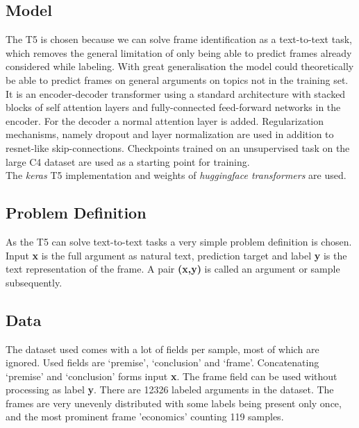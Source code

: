 \documentclass[11pt,a4paper,onecolumn,oneside,notitlepage]{article}
\begin{document}
\subsection{Model}
The T5 is chosen because we can solve frame identification as a text-to-text task, which removes the general limitation of only being able to predict frames already considered while labeling. With great generalisation the model could theoretically be able to predict frames on general arguments on topics not in the training set. It is an encoder-decoder transformer using a standard architecture with stacked blocks of  self attention layers and fully-connected feed-forward networks in the encoder. For the decoder a normal attention layer is added. Regularization mechanisms, namely dropout and layer normalization are used in addition to resnet-like skip-connections.\citep{T5} Checkpoints trained on an unsupervised task on the large C4 \citep{2019t5} dataset are used as a starting point for training.\\

The \textit{keras} \citep{keras} T5 implementation and weights of \textit{huggingface transformers} \citep{wolf-etal-2020-transformers} are used.


\subsection{Problem Definition}

As the T5 can solve text-to-text tasks a very simple problem definition is chosen. Input \textbf{x} is the full argument as natural text, prediction target and label \textbf{y} is the text representation of the frame. A pair \textbf{(x,y)} is called an argument or sample subsequently. 
\subsection{Data}
\label{subsec:data}
The dataset used \citep{webis_task_paper}  comes with a lot of fields per sample, most of which are ignored. Used fields are ‘premise’, ‘conclusion’ and ‘frame’. Concatenating ‘premise’ and ‘conclusion’ forms input \textbf{x}. The frame field can be used without processing as label \textbf{y}. There are \num{12326} labeled arguments in the dataset. The frames are very unevenly distributed with some labels being present only once, and the most prominent frame 'economics' counting 119 samples.
\end{document}
